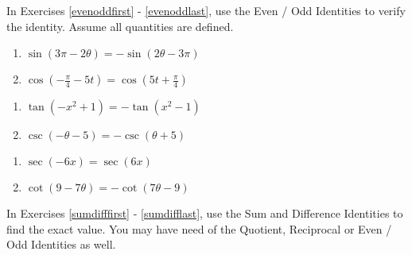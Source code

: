 \documentclass{ximera}
\begin{document}
	\author{Stitz-Zeager}


In Exercises \ref{evenoddfirst} - \ref{evenoddlast}, use the Even / Odd Identities to verify the identity.  Assume all quantities are defined.

\begin{multicols}{2}

\begin{enumerate}

\item $\sin(3\pi - 2\theta) = -\sin(2\theta - 3\pi)$  \label{evenoddfirst}
\item $\cos \left( -\frac{\pi}{4} - 5t \right) = \cos \left( 5t + \frac{\pi}{4} \right)$

\setcounter{HW}{\value{enumi}}

\end{enumerate}

\end{multicols}

\begin{multicols}{2}

\begin{enumerate}

\setcounter{enumi}{\value{HW}}

\item $\tan(-x^{2} + 1) = -\tan(x^{2} - 1)$
\item $\csc(-\theta - 5) = -\csc(\theta + 5)$

\setcounter{HW}{\value{enumi}}

\end{enumerate}

\end{multicols}

\begin{multicols}{2}

\begin{enumerate}

\setcounter{enumi}{\value{HW}}

\item $\sec(-6x) = \sec(6x)$
\item $\cot(9 - 7\theta) = -\cot(7\theta - 9)$ \label{evenoddlast}

\setcounter{HW}{\value{enumi}}

\end{enumerate}

\end{multicols}

In Exercises \ref{sumdifffirst} - \ref{sumdifflast}, use the Sum and Difference Identities to find the exact value.  You may have need of the Quotient, Reciprocal or Even / Odd Identities as well.
\end{document}
